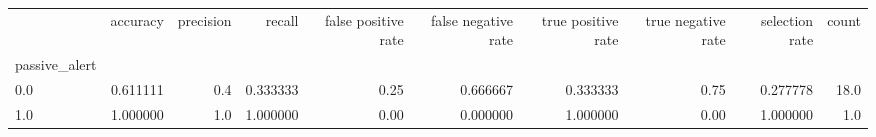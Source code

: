\begin{tabular}{lrrrrrrrrr}
\toprule
{} &  accuracy &  precision &    recall &  false positive rate &  false negative rate &  true positive rate &  true negative rate &  selection rate &  count \\
passive\_alert &           &            &           &                      &                      &                     &                     &                 &        \\
\midrule
0.0           &  0.611111 &        0.4 &  0.333333 &                 0.25 &             0.666667 &            0.333333 &                0.75 &        0.277778 &   18.0 \\
1.0           &  1.000000 &        1.0 &  1.000000 &                 0.00 &             0.000000 &            1.000000 &                0.00 &        1.000000 &    1.0 \\
\bottomrule
\end{tabular}

